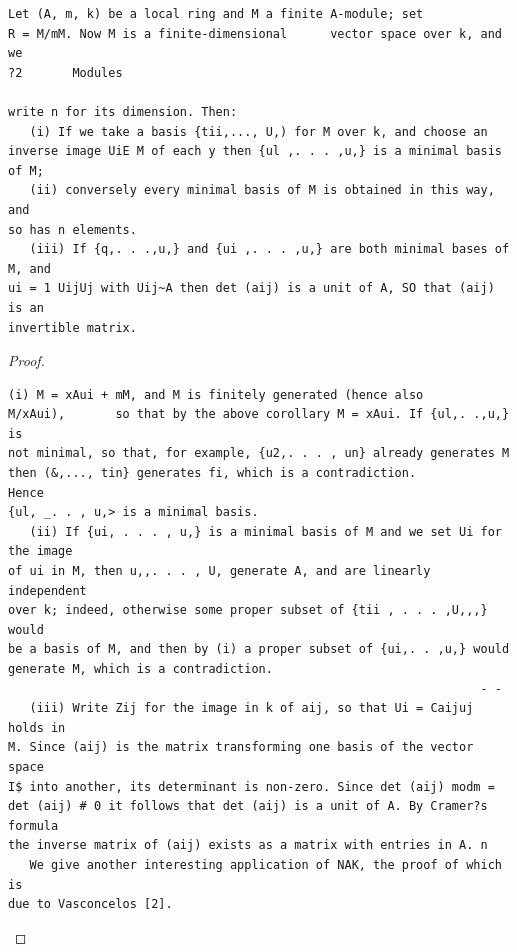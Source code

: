 \begin{theorem}\label{mcrt-auto-theorem-2-3}\uses{}
\begin{verbatim}
Let (A, m, k) be a local ring and M a finite A-module; set
R = M/mM. Now M is a finite-dimensional      vector space over k, and we
?2       Modules

write n for its dimension. Then:
   (i) If we take a basis {tii,..., U,) for M over k, and choose an
inverse image UiE M of each y then {ul ,. . . ,u,} is a minimal basis
of M;
   (ii) conversely every minimal basis of M is obtained in this way, and
so has n elements.
   (iii) If {q,. . .,u,} and {ui ,. . . ,u,} are both minimal bases of M, and
ui = 1 UijUj with Uij~A then det (aij) is a unit of A, SO that (aij) is an
invertible matrix.
\end{verbatim}
\end{theorem}
\begin{proof}
\begin{verbatim}
(i) M = xAui + mM, and M is finitely generated (hence also
M/xAui),       so that by the above corollary M = xAui. If {ul,. .,u,} is
not minimal, so that, for example, {u2,. . . , un} already generates M
then (&,..., tin} generates fi, which is a contradiction.                 Hence
{ul, _. . , u,> is a minimal basis.
   (ii) If {ui, . . . , u,} is a minimal basis of M and we set Ui for the image
of ui in M, then u,,. . . , U, generate A, and are linearly independent
over k; indeed, otherwise some proper subset of {tii , . . . ,U,,,} would
be a basis of M, and then by (i) a proper subset of {ui,. . ,u,} would
generate M, which is a contradiction.
                                                                  - -
   (iii) Write Zij for the image in k of aij, so that Ui = Caijuj holds in
M. Since (aij) is the matrix transforming one basis of the vector space
I$ into another, its determinant is non-zero. Since det (aij) modm =
det (aij) # 0 it follows that det (aij) is a unit of A. By Cramer?s formula
the inverse matrix of (aij) exists as a matrix with entries in A. n
   We give another interesting application of NAK, the proof of which is
due to Vasconcelos [2].
\end{verbatim}
\end{proof}


